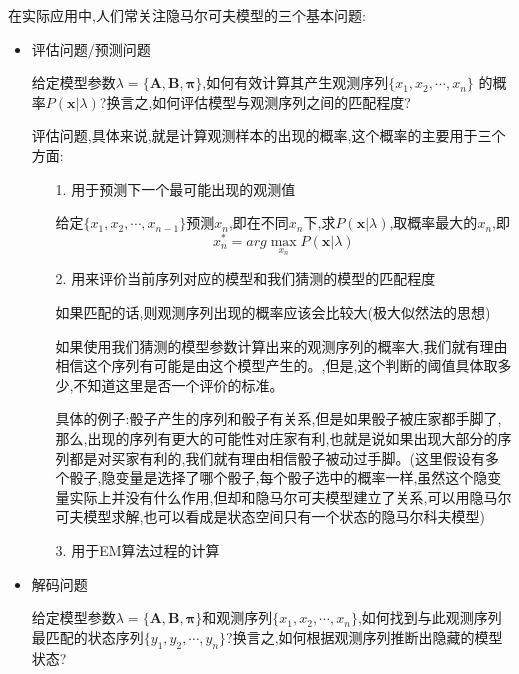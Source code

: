 \documentclass[UTF8,a4paper]{ctexart}%
\begin{document}
            在实际应用中,人们常关注隐马尔可夫模型的三个基本问题:
            \begin{itemize}
              \item 评估问题/预测问题

                  给定模型参数$\lambda = \{\bm{A,B,\pi}\}$,如何有效计算其产生观测序列$\{x_1, x_2, \cdots , x_n\}$ 的概率$P(\bm{x} | \lambda)$?换言之,如何评估模型与观测序列之间的匹配程度?

                  {\color{blue}

                  评估问题,具体来说,就是计算观测样本的出现的概率,这个概率的主要用于三个方面:

                  \begin{itemize}
                    \item [1.] 用于预测下一个最可能出现的观测值

                          给定$\{x_1, x_2, \cdots , x_{n-1}\}$预测$x_n$,即在不同$x_n$下,求$P(\bm{x} | \lambda)$,取概率最大的$x_n$,即
                              \[ x_n^* = arg \max_{x_n} P(\bm{x} | \lambda) \]

                    \item [2.] 用来评价当前序列对应的模型和我们猜测的模型的匹配程度

                          如果匹配的话,则观测序列出现的概率应该会比较大(极大似然法的思想)

                          如果使用我们猜测的模型参数计算出来的观测序列的概率大,我们就有理由相信这个序列有可能是由这个模型产生的。{\color{red},但是,这个判断的阈值具体取多少,不知道这里是否一个评价的标准。}

                          具体的例子:骰子产生的序列和骰子有关系,但是如果骰子被庄家都手脚了,那么,出现的序列有更大的可能性对庄家有利,也就是说如果出现大部分的序列都是对买家有利的,我们就有理由相信骰子被动过手脚。(这里假设有多个骰子,隐变量是选择了哪个骰子,每个骰子选中的概率一样,虽然这个隐变量实际上并没有什么作用,但却和隐马尔可夫模型建立了关系,可以用隐马尔可夫模型求解,也可以看成是状态空间只有一个状态的隐马尔科夫模型)\\

                    \item [3.] 用于EM算法过程的计算
                  \end{itemize}
                  }

              \item 解码问题

                  给定模型参数$\lambda = \{\bm{A,B,\pi}\}$和观测序列$\{x_1, x_2, \cdots , x_n\}$,如何找到与此观测序列最匹配的状态序列$\{y_1,y_2 , \cdots , y_n\}$?换言之,如何根据观测序列推断出隐藏的模型状态?


\end{itemize}
\end{document}

